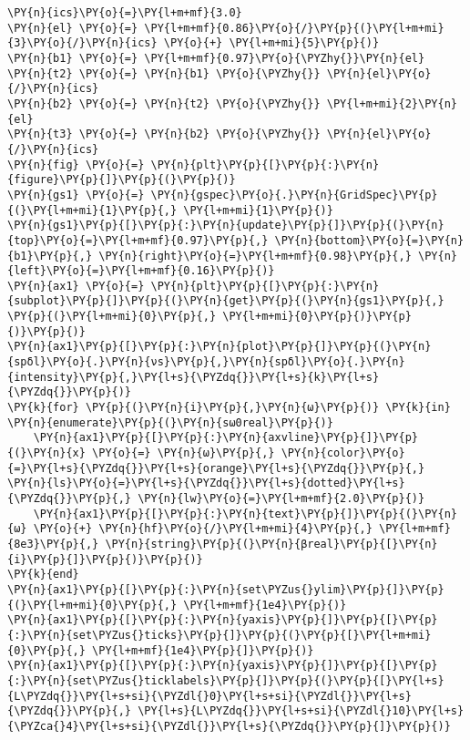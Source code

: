 \begin{Verbatim}[commandchars=\\\{\}]
\PY{n}{ics}\PY{o}{=}\PY{l+m+mf}{3.0}
\PY{n}{el} \PY{o}{=} \PY{l+m+mf}{0.86}\PY{o}{/}\PY{p}{(}\PY{l+m+mi}{3}\PY{o}{/}\PY{n}{ics} \PY{o}{+} \PY{l+m+mi}{5}\PY{p}{)}
\PY{n}{b1} \PY{o}{=} \PY{l+m+mf}{0.97}\PY{o}{\PYZhy{}}\PY{n}{el}
\PY{n}{t2} \PY{o}{=} \PY{n}{b1} \PY{o}{\PYZhy{}} \PY{n}{el}\PY{o}{/}\PY{n}{ics}
\PY{n}{b2} \PY{o}{=} \PY{n}{t2} \PY{o}{\PYZhy{}} \PY{l+m+mi}{2}\PY{n}{el}
\PY{n}{t3} \PY{o}{=} \PY{n}{b2} \PY{o}{\PYZhy{}} \PY{n}{el}\PY{o}{/}\PY{n}{ics}
\PY{n}{fig} \PY{o}{=} \PY{n}{plt}\PY{p}{[}\PY{p}{:}\PY{n}{figure}\PY{p}{]}\PY{p}{(}\PY{p}{)}
\PY{n}{gs1} \PY{o}{=} \PY{n}{gspec}\PY{o}{.}\PY{n}{GridSpec}\PY{p}{(}\PY{l+m+mi}{1}\PY{p}{,} \PY{l+m+mi}{1}\PY{p}{)}
\PY{n}{gs1}\PY{p}{[}\PY{p}{:}\PY{n}{update}\PY{p}{]}\PY{p}{(}\PY{n}{top}\PY{o}{=}\PY{l+m+mf}{0.97}\PY{p}{,} \PY{n}{bottom}\PY{o}{=}\PY{n}{b1}\PY{p}{,} \PY{n}{right}\PY{o}{=}\PY{l+m+mf}{0.98}\PY{p}{,} \PY{n}{left}\PY{o}{=}\PY{l+m+mf}{0.16}\PY{p}{)}
\PY{n}{ax1} \PY{o}{=} \PY{n}{plt}\PY{p}{[}\PY{p}{:}\PY{n}{subplot}\PY{p}{]}\PY{p}{(}\PY{n}{get}\PY{p}{(}\PY{n}{gs1}\PY{p}{,} \PY{p}{(}\PY{l+m+mi}{0}\PY{p}{,} \PY{l+m+mi}{0}\PY{p}{)}\PY{p}{)}\PY{p}{)}
\PY{n}{ax1}\PY{p}{[}\PY{p}{:}\PY{n}{plot}\PY{p}{]}\PY{p}{(}\PY{n}{spδl}\PY{o}{.}\PY{n}{νs}\PY{p}{,}\PY{n}{spδl}\PY{o}{.}\PY{n}{intensity}\PY{p}{,}\PY{l+s}{\PYZdq{}}\PY{l+s}{k}\PY{l+s}{\PYZdq{}}\PY{p}{)}
\PY{k}{for} \PY{p}{(}\PY{n}{i}\PY{p}{,}\PY{n}{ω}\PY{p}{)} \PY{k}{in} \PY{n}{enumerate}\PY{p}{(}\PY{n}{sω0real}\PY{p}{)}
    \PY{n}{ax1}\PY{p}{[}\PY{p}{:}\PY{n}{axvline}\PY{p}{]}\PY{p}{(}\PY{n}{x} \PY{o}{=} \PY{n}{ω}\PY{p}{,} \PY{n}{color}\PY{o}{=}\PY{l+s}{\PYZdq{}}\PY{l+s}{orange}\PY{l+s}{\PYZdq{}}\PY{p}{,} \PY{n}{ls}\PY{o}{=}\PY{l+s}{\PYZdq{}}\PY{l+s}{dotted}\PY{l+s}{\PYZdq{}}\PY{p}{,} \PY{n}{lw}\PY{o}{=}\PY{l+m+mf}{2.0}\PY{p}{)}
    \PY{n}{ax1}\PY{p}{[}\PY{p}{:}\PY{n}{text}\PY{p}{]}\PY{p}{(}\PY{n}{ω} \PY{o}{+} \PY{n}{hf}\PY{o}{/}\PY{l+m+mi}{4}\PY{p}{,} \PY{l+m+mf}{8e3}\PY{p}{,} \PY{n}{string}\PY{p}{(}\PY{n}{βreal}\PY{p}{[}\PY{n}{i}\PY{p}{]}\PY{p}{)}\PY{p}{)}
\PY{k}{end}
\PY{n}{ax1}\PY{p}{[}\PY{p}{:}\PY{n}{set\PYZus{}ylim}\PY{p}{]}\PY{p}{(}\PY{l+m+mi}{0}\PY{p}{,} \PY{l+m+mf}{1e4}\PY{p}{)}
\PY{n}{ax1}\PY{p}{[}\PY{p}{:}\PY{n}{yaxis}\PY{p}{]}\PY{p}{[}\PY{p}{:}\PY{n}{set\PYZus{}ticks}\PY{p}{]}\PY{p}{(}\PY{p}{[}\PY{l+m+mi}{0}\PY{p}{,} \PY{l+m+mf}{1e4}\PY{p}{]}\PY{p}{)}
\PY{n}{ax1}\PY{p}{[}\PY{p}{:}\PY{n}{yaxis}\PY{p}{]}\PY{p}{[}\PY{p}{:}\PY{n}{set\PYZus{}ticklabels}\PY{p}{]}\PY{p}{(}\PY{p}{[}\PY{l+s}{L\PYZdq{}}\PY{l+s+si}{\PYZdl{}0}\PY{l+s+si}{\PYZdl{}}\PY{l+s}{\PYZdq{}}\PY{p}{,} \PY{l+s}{L\PYZdq{}}\PY{l+s+si}{\PYZdl{}10}\PY{l+s}{\PYZca{}4}\PY{l+s+si}{\PYZdl{}}\PY{l+s}{\PYZdq{}}\PY{p}{]}\PY{p}{)}

\end{Verbatim}
